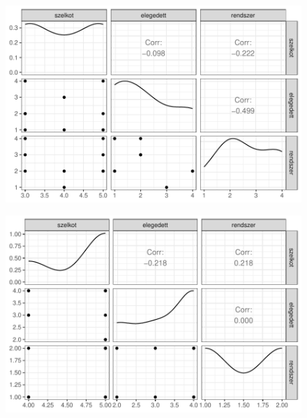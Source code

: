 \documentclass[
  letterpaper,
]{krantz}
\begin{document}
\begin{figure}[H]

{\centering \includegraphics{./sec_tobbvaltozos_variancia_files/figure-pdf/unnamed-chunk-19-1.pdf}

}

\end{figure}

\begin{figure}[H]

{\centering \includegraphics{./sec_tobbvaltozos_variancia_files/figure-pdf/unnamed-chunk-19-2.pdf}

}

\end{figure}
\end{document}
